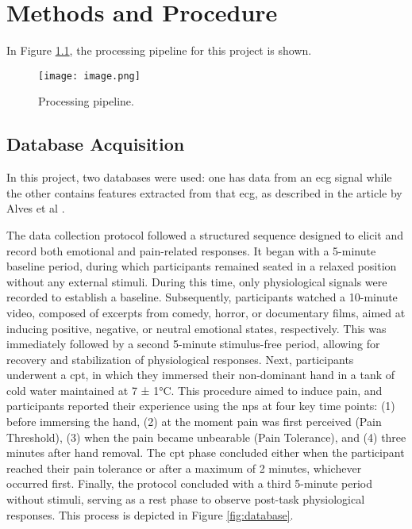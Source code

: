 \chapter{Methods and Procedure}
\label{chapter:methods}

In Figure \ref{fig:image}, the processing pipeline for this project is shown.

\begin{figure}[h!]
    \centering
    \texttt{[image: image.png]}
    \caption{Processing pipeline.}
    \label{fig:image}
\end{figure}

\section{Database Acquisition}
In this project, two databases were used: one has data from an \ac{ecg} signal while the other contains features extracted from that \ac{ecg}, as described in the article by Alves et al \cite{Alves2024}.

The data collection protocol followed a structured sequence designed to elicit and record both emotional and pain-related responses. It began with a 5-minute baseline period, during which participants remained seated in a relaxed position without any external stimuli. During this time, only physiological signals were recorded to establish a baseline.
Subsequently, participants watched a 10-minute video, composed of excerpts from comedy, horror, or documentary films, aimed at inducing positive, negative, or neutral emotional states, respectively. This was immediately followed by a second 5-minute stimulus-free period, allowing for recovery and stabilization of physiological responses.
Next, participants underwent a \ac{cpt}, in which they immersed their non-dominant hand in a tank of cold water maintained at 7 ± 1°C. This procedure aimed to induce pain, and participants reported their experience using the \ac{nps} at four key time points: (1) before immersing the hand, (2) at the moment pain was first perceived (Pain Threshold), (3) when the pain became unbearable (Pain Tolerance), and (4) three minutes after hand removal. The \ac{cpt} phase concluded either when the participant reached their pain tolerance or after a maximum of 2 minutes, whichever occurred first.
Finally, the protocol concluded with a third 5-minute period without stimuli, serving as a rest phase to observe post-task physiological responses. 
This process is depicted in Figure \ref{fig:database}. 


